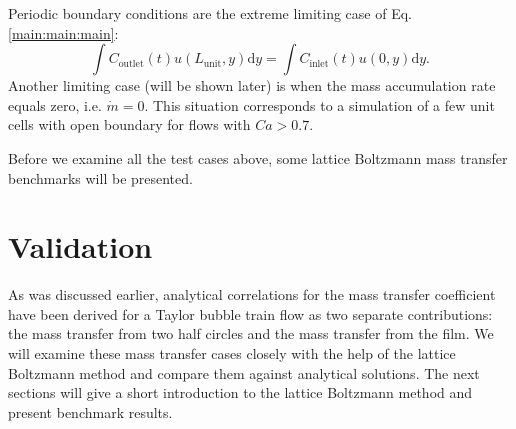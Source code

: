 \documentclass[preprint,12pt]{elsarticle}
\newcommand{\beqstar}{\begin{equation*}}
\newcommand{\feqstar}{\end{equation*}}
\newcommand{\lunit}{L_{\mathrm{unit}}}
\newcommand{\cinlet}{C_{\mathrm{inlet}}}
\newcommand{\coutlet}{C_{\mathrm{outlet}}}
\begin{document}
Periodic boundary conditions are the extreme
limiting case of Eq. \ref{main:main:main}: 
\beqstar
\int{\coutlet(t)
u(\lunit,y)\mathrm{d}y}=\int{\cinlet(t) u(0,y)\mathrm{d}y}. 
\feqstar
Another limiting case (will be shown later) is when the mass accumulation rate equals zero, i.e. $\dot{m}=0$. 
This situation corresponds to a simulation of a few unit cells with open boundary for flows with
$Ca>0.7$.   

Before we examine all the test cases above, some lattice Boltzmann mass transfer
benchmarks will be presented. 

\section{Validation}
As was discussed earlier, analytical correlations for the mass transfer coefficient
have been derived for a Taylor bubble train flow  as two separate contributions: the mass transfer from two
half circles and the mass transfer from the film. We will examine these
mass transfer cases closely with the help of the lattice Boltzmann method and compare them
against analytical
solutions. The next sections will give a short introduction to the lattice Boltzmann method and present benchmark results.
\end{document}
